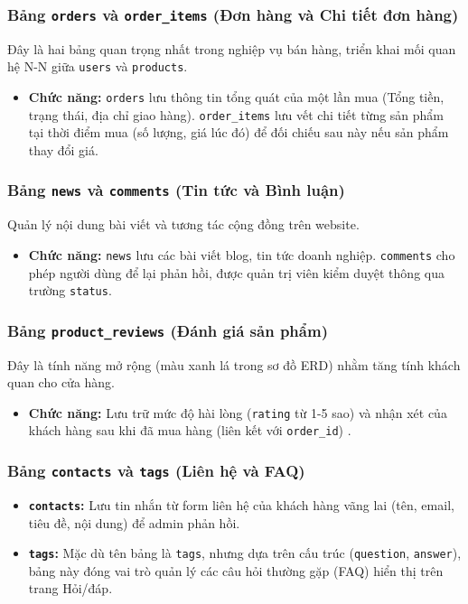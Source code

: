 \subsubsection{Bảng \texttt{orders} và \texttt{order\_items} (Đơn hàng và Chi tiết đơn hàng)}
Đây là hai bảng quan trọng nhất trong nghiệp vụ bán hàng, triển khai mối quan hệ N-N giữa \texttt{users} và \texttt{products}.
\begin{itemize}
    \item \textbf{Chức năng:} \texttt{orders} lưu thông tin tổng quát của một lần mua (Tổng tiền, trạng thái, địa chỉ giao hàng). \texttt{order\_items} lưu vết chi tiết từng sản phẩm tại thời điểm mua (số lượng, giá lúc đó) để đối chiếu sau này nếu sản phẩm thay đổi giá.
\end{itemize}

\subsubsection{Bảng \texttt{news} và \texttt{comments} (Tin tức và Bình luận)}
Quản lý nội dung bài viết và tương tác cộng đồng trên website.
\begin{itemize}
    \item \textbf{Chức năng:} \texttt{news} lưu các bài viết blog, tin tức doanh nghiệp. \texttt{comments} cho phép người dùng để lại phản hồi, được quản trị viên kiểm duyệt thông qua trường \texttt{status}.
\end{itemize}

\subsubsection{Bảng \texttt{product\_reviews} (Đánh giá sản phẩm)}
Đây là tính năng mở rộng (màu xanh lá trong sơ đồ ERD) nhằm tăng tính khách quan cho cửa hàng.
\begin{itemize}
    \item \textbf{Chức năng:} Lưu trữ mức độ hài lòng (\texttt{rating} từ 1-5 sao) và nhận xét của khách hàng sau khi đã mua hàng (liên kết với \texttt{order\_id}) .
\end{itemize}

\subsubsection{Bảng \texttt{contacts} và \texttt{tags} (Liên hệ và FAQ)}
\begin{itemize}
    \item \textbf{\texttt{contacts}:} Lưu tin nhắn từ form liên hệ của khách hàng vãng lai (tên, email, tiêu đề, nội dung) để admin phản hồi.
    \item \textbf{\texttt{tags}:} Mặc dù tên bảng là \texttt{tags}, nhưng dựa trên cấu trúc (\texttt{question}, \texttt{answer}), bảng này đóng vai trò quản lý các câu hỏi thường gặp (FAQ) hiển thị trên trang Hỏi/đáp.
\end{itemize}

